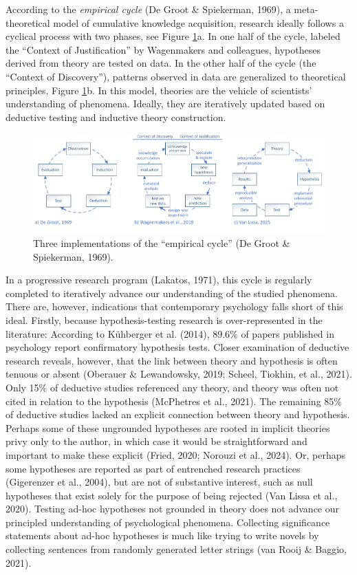 \documentclass[
  man, noextraspace,floatsintext]{apa7}
\begin{document}
According to the \emph{empirical cycle} (De Groot \& Spiekerman, 1969),
a meta-theoretical model of cumulative knowledge acquisition,
research ideally follows a cyclical process with two phases, see Figure \ref{fig:figecs}a.
In one half of the cycle, labeled the ``Context of Justification'' by Wagenmakers and colleagues, hypotheses derived from theory are tested on data. In the other half of the cycle (the ``Context of Discovery''),
patterns observed in data are generalized to theoretical principles, Figure \ref{fig:figecs}b.
In this model, theories are the vehicle of scientists' understanding of phenomena.
Ideally, they are iteratively updated based on deductive testing and inductive theory construction.

\begin{figure}
\centering
\includegraphics{ec_visio.pdf}
\caption{\label{fig:figecs}Three implementations of the ``empirical cycle'' (De Groot \& Spiekerman, 1969).}
\end{figure}

In a progressive research program (Lakatos, 1971),
this cycle is regularly completed to iteratively advance our understanding of the studied phenomena.
There are, however, indications that contemporary psychology falls short of this ideal.
Firstly, because hypothesis-testing research is over-represented in the literature:
According to Kühberger et al. (2014), 89.6\% of papers published in psychology report confirmatory hypothesis tests.
Closer examination of deductive research reveals, however, that the link between theory and hypothesis is often tenuous or absent (Oberauer \& Lewandowsky, 2019; Scheel, Tiokhin, et al., 2021).
Only 15\% of deductive studies referenced any theory, and theory was often not cited in relation to the hypothesis (McPhetres et al., 2021).
The remaining 85\% of deductive studies lacked an explicit connection between theory and hypothesis.
Perhaps some of these ungrounded hypotheses are rooted in implicit theories privy only to the author,
in which case it would be straightforward and important to make these explicit (Fried, 2020; Norouzi et al., 2024).
Or, perhaps some hypotheses are reported as part of entrenched research practices (Gigerenzer et al., 2004),
but are not of substantive interest, such as null hypotheses that exist solely for the purpose of being rejected (Van Lissa et al., 2020).
Testing ad-hoc hypotheses not grounded in theory does not advance our principled understanding of psychological phenomena.
Collecting significance statements about ad-hoc hypotheses is much like trying to write novels by collecting sentences from randomly generated letter strings (van Rooij \& Baggio, 2021).
\end{document}
